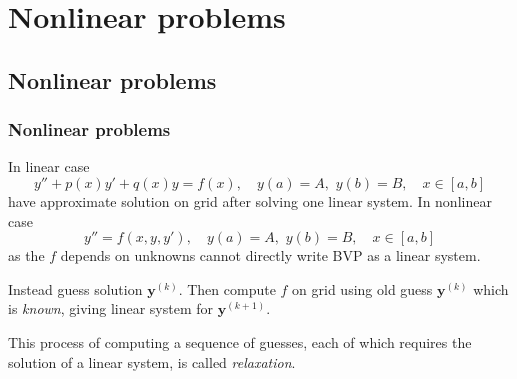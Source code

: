 \documentclass{beamer}
\newcommand{\by}{{\boldsymbol{y}}}
\begin{document}
\section{Nonlinear problems}

\subsection{Nonlinear problems}


\begin{frame}
  \frametitle{Nonlinear problems}

  In linear case
  \begin{equation*}
    y'' + p(x) y' + q(x) y =  f(x), \quad y(a) = A, \,\, y(b) = B,
    \quad x \in [a,b]
  \end{equation*}
  have approximate solution on grid after solving one linear
  system. In nonlinear case
  \begin{equation*}
    y'' = f(x, y, y'), \quad y(a) = A, \,\, y(b) = B, \quad x \in [a,b]
  \end{equation*}
  as the $f$ depends on unknowns cannot directly write BVP as a linear
  system. \pause

  \vspace{1ex}

  Instead guess solution $\by^{(k)}$. Then compute $f$ on grid using
  old guess $\by^{(k)}$ which is \emph{known}, giving linear system
  for $\by^{(k+1)}$. \pause

  \vspace{1ex}

  This process of computing a sequence of guesses, each of which
  requires the solution of a linear system, is called
  \emph{relaxation}.

\end{frame}
\end{document}
